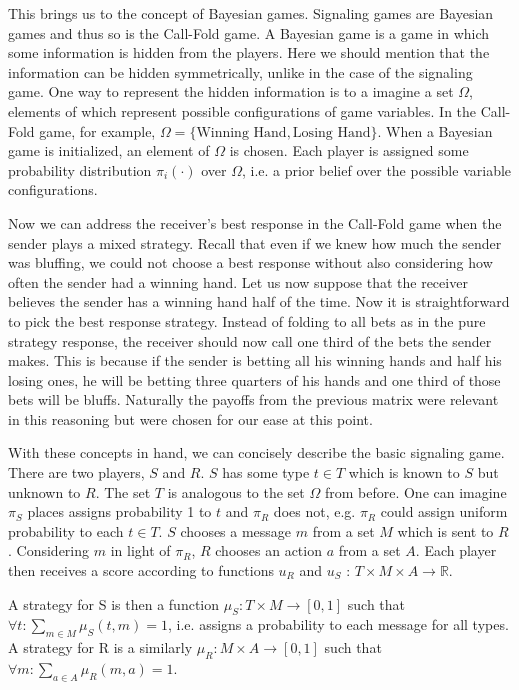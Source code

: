 \documentclass{article}
\begin{document}
This brings us to the concept of Bayesian games. Signaling games are Bayesian games and thus so is the Call-Fold game. A Bayesian game is a game in which some information is hidden from the players. Here we should mention that the information can be hidden symmetrically, unlike in the case of the signaling game. One way to represent the hidden information is to a imagine a set $\Omega$, elements of which represent possible configurations of game variables. In the Call-Fold game, for example, $\Omega = \{\text{Winning Hand}, \text{Losing Hand}\}$. When a Bayesian game is initialized, an element of $\Omega$ is chosen. Each player is assigned some probability distribution $\pi_{i}(\cdot)$ over $\Omega$, i.e. a prior belief over the possible variable configurations.

Now we can address the receiver's best response in the Call-Fold game when the sender plays a mixed strategy. Recall that even if we knew how much the sender was bluffing, we could not choose a best response without also considering how often the sender had a winning hand. Let us now suppose that the receiver believes the sender has a winning hand half of the time. Now it is straightforward to pick the best response strategy. Instead of folding to all bets as in the pure strategy response, the receiver should now call one third of the bets the sender makes. This is because if the sender is betting all his winning hands and half his losing ones, he will be betting three quarters of his hands and one third of those bets will be bluffs. Naturally the payoffs from the previous matrix were relevant in this reasoning but were chosen for our ease at this point.

With these concepts in hand, we can concisely describe the basic signaling game. There are two players, $S$ and $R$. $S$ has some type $t \in T$ which is known to $S$ but unknown to $R$. The set $T$ is analogous to the set $\Omega$ from before. One can imagine $\pi_{S}$ places assigns probability 1 to $t$ and $\pi_{R}$ does not, e.g. $\pi_{R}$ could assign uniform probability to each $t \in T$. $S$ chooses a message $m$ from a set $M$ which is sent to $R$. Considering $m$ in light of $\pi_R$, $R$ chooses an action $a$ from a set $A$. Each player then receives a score according to functions $u_R$ and $u_S$ : $T \times M \times A \to \mathbb{R}$.

A strategy for S is then a function $\mu_{S}: T \times M \to [0,1]$ such that $\forall t: \sum_{m \in M} \mu_{S}(t, m) = 1$, i.e. assigns a probability to each message for all types. A strategy for R is a similarly $\mu_{R} : M \times A \to [0,1]$ such that $\forall m: \sum_{a \in A} \mu_{R}(m,a) = 1$.
\end{document}
